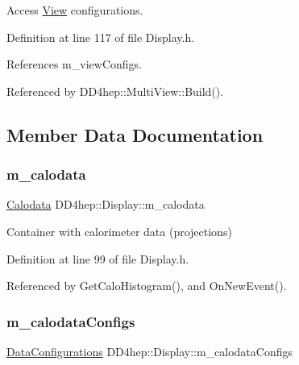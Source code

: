 Access \hyperlink{class_d_d4hep_1_1_view}{View} configurations. 



Definition at line 117 of file Display.\+h.



References m\+\_\+view\+Configs.



Referenced by D\+D4hep\+::\+Multi\+View\+::\+Build().



\subsection{Member Data Documentation}
\hypertarget{class_d_d4hep_1_1_display_a5f32c54601dd6e6a8556e6ffbafb10cc}{}\label{class_d_d4hep_1_1_display_a5f32c54601dd6e6a8556e6ffbafb10cc} 
\subsubsection{\texorpdfstring{m\+\_\+calodata}{m\_calodata}}
{\footnotesize\ttfamily \hyperlink{class_d_d4hep_1_1_display_a692339ace65797a205d2332c4a652598}{Calodata} D\+D4hep\+::\+Display\+::m\+\_\+calodata\hspace{0.3cm}{\ttfamily [protected]}}



Container with calorimeter data (projections) 



Definition at line 99 of file Display.\+h.



Referenced by Get\+Calo\+Histogram(), and On\+New\+Event().

\hypertarget{class_d_d4hep_1_1_display_a6b3fd66eb5ee434f3cf10b2934cb71a3}{}\label{class_d_d4hep_1_1_display_a6b3fd66eb5ee434f3cf10b2934cb71a3} 
\subsubsection{\texorpdfstring{m\+\_\+calodata\+Configs}{m\_calodataConfigs}}
{\footnotesize\ttfamily \hyperlink{class_d_d4hep_1_1_display_a730a4516989abe8b2f788c8f957e0633}{Data\+Configurations} D\+D4hep\+::\+Display\+::m\+\_\+calodata\+Configs\hspace{0.3cm}{\ttfamily [protected]}}



